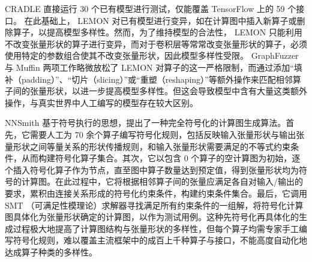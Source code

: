 CRADLE\cite{cradle} 直接运行 30 个已有模型进行测试，仅能覆盖 TensorFlow 上的 59 个接口。
在此基础上， LEMON\cite{lemon} 对已有模型进行变异，如在计算图中插入新算子或删除算子，以提高模型多样性。然而，为了维持模型的合法性， LEMON 只能利用不改变张量形状的算子进行变异，而对于卷积层等常常改变张量形状的算子，必须使用特定的参数组合使其不改变张量形状，因此模型多样性受限。
GraphFuzzer\cite{graphfuzzer} 与 Muffin\cite{muffin} 两项工作略微放松了 LEMON 对算子的这一严格限制，而通过添加“填补（padding）”、“切片（slicing）”或“重塑（reshaping）”等额外操作来匹配相邻算子间的张量形状，以进一步提高模型多样性。但这会导致模型中含有大量这类额外操作，与真实世界中人工编写的模型存在较大区别。

NNSmith\cite{nnsmith} 基于符号执行的思想，提出了一种完全符号化的计算图生成算法。首先，它需要人工为 70 余个算子编写符号化规则，包括反映输入张量形状与输出张量形状之间等量关系的形状传播规则，和输入张量形状需要满足的不等式约束条件，从而构建符号化算子集合。其次，它以包含 0 个算子的空计算图为初始，逐个插入符号化算子作为节点，直至图中算子数量达到预定值，得到张量形状均为符号的计算图。在此过程中，它将根据相邻算子间的张量应满足各自对输入/输出的要求，累积由连接关系形成的符号化约束条件，构建约束条件集合。最后，它调用 SMT （可满足性模理论）求解器寻找满足所有约束条件的一组解，将符号化计算图具体化为张量形状确定的计算图，以作为测试用例。这种先符号化再具体化的生成过程极大地提高了计算图结构与张量形状的多样性，但每个算子均需专家手工编写符号化规则，难以覆盖主流框架中的成百上千种算子与接口，不能高度自动化地达成算子种类的多样性。



